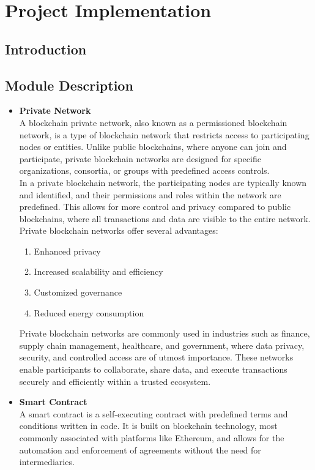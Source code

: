 \documentclass[oneside, 12pt]{book}
\begin{document}
	\section{Project Implementation}
	\newpage
		\subsection{Introduction}
		\subsection{Module Description}
			\begin{itemize}
				\item\textbf{Private Network}
					\\A blockchain private network, also known as a permissioned blockchain network, is a type of blockchain network that restricts access to participating nodes or entities. Unlike public blockchains, where anyone can join and participate, private blockchain networks are designed for specific organizations, consortia, or groups with predefined access controls.
					\\In a private blockchain network, the participating nodes are typically known and identified, and their permissions and roles within the network are predefined. This allows for more control and privacy compared to public blockchains, where all transactions and data are visible to the entire network.
					\\Private blockchain networks offer several advantages:
					\begin{enumerate}
						\item Enhanced privacy
						\item Increased scalability and efficiency
						\item Customized governance
						\item Reduced energy consumption
					\end{enumerate}
					Private blockchain networks are commonly used in industries such as finance, supply chain management, healthcare, and government, where data privacy, security, and controlled access are of utmost importance. These networks enable participants to collaborate, share data, and execute transactions securely and efficiently within a trusted ecosystem.
				\item\textbf{Smart Contract}
					\\A smart contract is a self-executing contract with predefined terms and conditions written in code. It is built on blockchain technology, most commonly associated with platforms like Ethereum, and allows for the automation and enforcement of agreements without the need for intermediaries.

\end{itemize}
\end{document}
